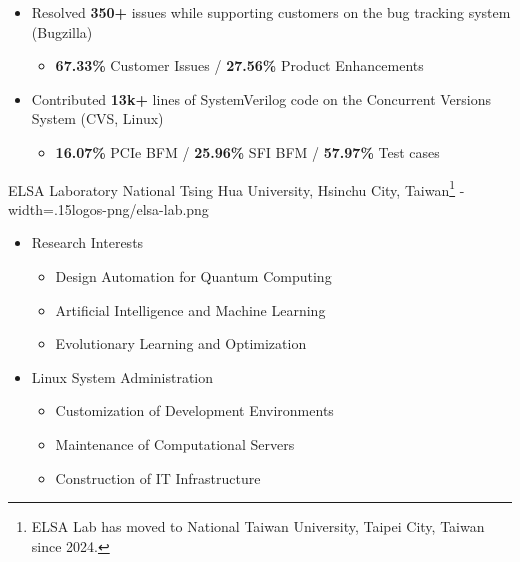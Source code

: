 \documentclass{cvclass}
\newcommand{\simplemmyy}[3]{\shortmmyyformat\formatdate{#3}{#2}{#1}}
\begin{document}
{\begin{itemize}
\begin{itemize}
        \end{itemize}
        \item Resolved \textbf{350+} issues while supporting customers on the bug tracking system (Bugzilla)
        \begin{itemize}
            \item {\textbf{67.33\%} Customer Issues / \textbf{27.56\%} Product Enhancements}
        \end{itemize}
        \item Contributed \textbf{13k+} lines of SystemVerilog code on the Concurrent Versions System (CVS, Linux)
        \begin{itemize}
            \item \textbf{16.07\%} PCIe BFM / \textbf{25.96\%} SFI BFM / \textbf{57.97\%} Test cases
        \end{itemize}
    \end{itemize}}

    {ELSA Laboratory}
    {National Tsing Hua University, Hsinchu City, Taiwan\footnote{ELSA Lab has moved to National Taiwan University, Taipei City, Taiwan since 2024.}}
    {\simplemmyy{2016}{2}{15} - \simplemmyy{2021}{6}{30}}
    {width=.15\linewidth}{logos-png/elsa-lab.png}
    {\begin{itemize}
        \item Research Interests
        \begin{itemize}
            \item Design Automation for Quantum Computing~\cite{chang2022mapping}
            \item Artificial Intelligence and Machine Learning~\cite{chang2022reusability,chen2024composing}
            \item Evolutionary Learning and Optimization~\cite{chang2022reusability}
        \end{itemize}
        \item Linux System Administration
        \begin{itemize}
            \item Customization of Development Environments
            \item Maintenance of Computational Servers
            \item Construction of IT Infrastructure
        \end{itemize}
    \end{itemize}}

\end{document}
